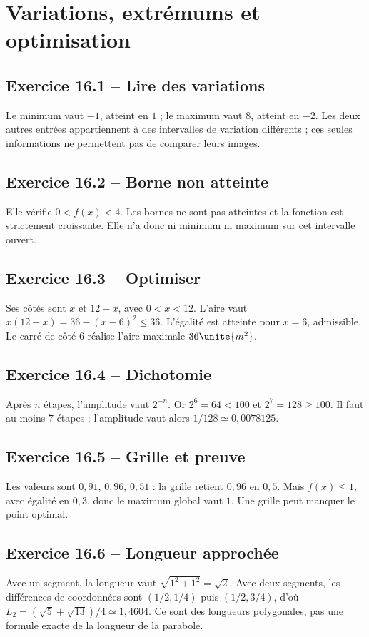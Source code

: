 \chapter{Variations, extrémums et optimisation}
\section*{Exercice 16.1 -- Lire des variations}
Le minimum vaut $-1$, atteint en $1$ ; le maximum vaut $8$, atteint en $-2$. Les deux autres entrées appartiennent à des intervalles de variation différents ; ces seules informations ne permettent pas de comparer leurs images.

\section*{Exercice 16.2 -- Borne non atteinte}
Elle vérifie $0<f(x)<4$. Les bornes ne sont pas atteintes et la fonction est strictement croissante. Elle n'a donc ni minimum ni maximum sur cet intervalle ouvert.

\section*{Exercice 16.3 -- Optimiser}
Ses côtés sont $x$ et $12-x$, avec $0<x<12$. L'aire vaut $x(12-x)=36-(x-6)^2\leq36$. L'égalité est atteinte pour $x=6$, admissible. Le carré de côté $6$ réalise l'aire maximale $36\unite{m^2}$.

\section*{Exercice 16.4 -- Dichotomie}
Après $n$ étapes, l'amplitude vaut $2^{-n}$. Or $2^6=64<100$ et $2^7=128\geq100$. Il faut au moins $7$ étapes ; l'amplitude vaut alors $1/128\simeq0{,}0078125$.

\section*{Exercice 16.5 -- Grille et preuve}
Les valeurs sont $0{,}91$, $0{,}96$, $0{,}51$ : la grille retient $0{,}96$ en $0{,}5$. Mais $f(x)\leq1$, avec égalité en $0{,}3$, donc le maximum global vaut $1$. Une grille peut manquer le point optimal.

\section*{Exercice 16.6 -- Longueur approchée}
Avec un segment, la longueur vaut $\sqrt{1^2+1^2}=\sqrt2$. Avec deux segments, les différences de coordonnées sont $(1/2,1/4)$ puis $(1/2,3/4)$, d'où $L_2=(\sqrt5+\sqrt{13})/4\simeq1{,}4604$. Ce sont des longueurs polygonales, pas une formule exacte de la longueur de la parabole.
